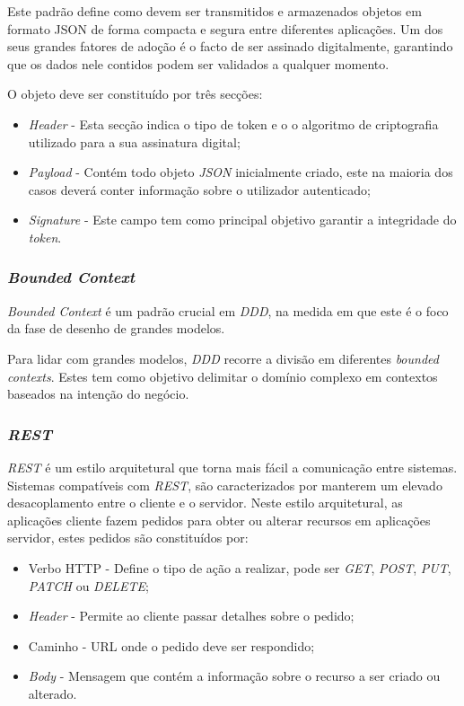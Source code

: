 Este padrão define como devem ser transmitidos e armazenados objetos em formato JSON de forma compacta e segura entre diferentes aplicações. Um dos seus grandes fatores de adoção é o facto de ser assinado digitalmente, garantindo que os dados nele contidos podem ser validados a qualquer momento\cite{jwt_medium}.

O objeto deve ser constituído por três secções:
\begin{itemize}
    \item \emph{Header} - Esta secção indica o tipo de token e o o algoritmo de criptografia utilizado para a sua assinatura digital;
    \item \emph{Payload} - Contém todo objeto \emph{JSON} inicialmente criado, este na maioria dos casos deverá conter informação sobre o utilizador autenticado;
    \item \emph{Signature} - Este campo tem como principal objetivo garantir a integridade do \emph{token}.
\end{itemize}

\subsubsection{\emph{Bounded Context}} \label{subsubsection:bounded:context}
\emph{Bounded Context} é um padrão crucial em \emph{\acrfull{DDD}}, na medida em que este é o foco da fase de desenho de grandes modelos.

Para lidar com grandes modelos, \emph{\acrshort{DDD}} recorre a divisão em diferentes \emph{bounded contexts}. Estes tem como objetivo delimitar o domínio complexo em contextos baseados na intenção do negócio\cite{bounded_context}.

\subsubsection{\emph{\acrshort{REST}}}
\emph{\acrshort{REST}} é um estilo arquitetural que torna mais fácil a comunicação entre sistemas. Sistemas compatíveis com \emph{\acrshort{REST}}, são caracterizados por manterem um elevado desacoplamento entre o cliente e o servidor.
Neste estilo arquitetural, as aplicações cliente fazem pedidos para obter ou alterar recursos em aplicações servidor, estes pedidos são constituídos por\cite{rest}:
\begin{itemize}
    \item Verbo HTTP - Define o tipo de ação a realizar, pode ser \emph{GET}, \emph{POST}, \emph{PUT}, \emph{PATCH} ou \emph{DELETE};
    \item \emph{Header} - Permite ao cliente passar detalhes sobre o pedido;
    \item Caminho - URL onde o pedido deve ser respondido;
    \item \emph{Body} - Mensagem que contém a informação sobre o recurso a ser criado ou alterado.
\end{itemize}


